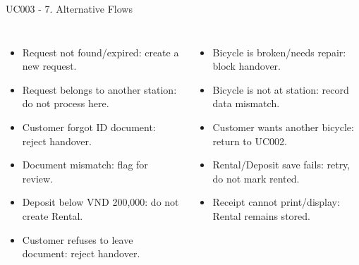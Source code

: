 \documentclass[aspectratio=169,10pt]{beamer}
\newcommand{\tightitems}{\setlength{\itemsep}{2pt}\setlength{\parskip}{0pt}}
\begin{document}
\begin{frame}{UC003 - 7. Alternative Flows}
\footnotesize
\begin{columns}[T,onlytextwidth]
\begin{itemize}\tightitems
  \item Request not found/expired: create a new request.
  \item Request belongs to another station: do not process here.
  \item Customer forgot ID document: reject handover.
  \item Document mismatch: flag for review.
  \item Deposit below VND 200,000: do not create Rental.
  \item Customer refuses to leave document: reject handover.
\end{itemize}
\begin{itemize}\tightitems
  \item Bicycle is broken/needs repair: block handover.
  \item Bicycle is not at station: record data mismatch.
  \item Customer wants another bicycle: return to UC002.
  \item Rental/Deposit save fails: retry, do not mark rented.
  \item Receipt cannot print/display: Rental remains stored.
\end{itemize}
\end{columns}
\end{frame}
\end{document}
